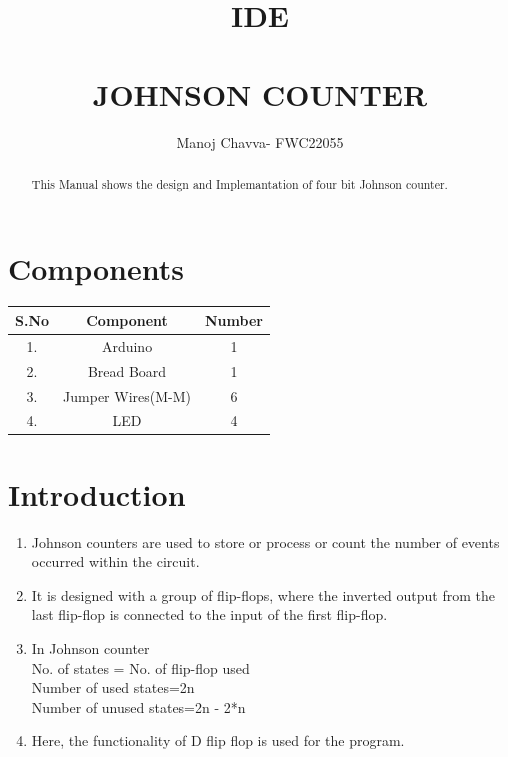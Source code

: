 \documentclass[journal,12pt,twocolumn]{IEEEtran}
\title{IDE  \\ \textbf{\\JOHNSON COUNTER}}
\author{Manoj Chavva- FWC22055}
\begin{document}
\maketitle

\tableofcontents
\vspace{0.5cm}
\begin{abstract}
  This Manual shows the design and Implemantation of four bit Johnson counter.
\end{abstract}   


 
     \section{Components}  
       

\begin{tabular}{|c|c|c|}
    \hline 
      \textbf{S.No} & \textbf{Component} & \textbf{Number}\\
      \hline
	1. & Arduino & 1 \\
	2. & Bread Board & 1 \\
	3. & Jumper Wires(M-M) & 6 \\
	4. & LED & 4 \\
	
      \hline
      
   \end{tabular}
   

     \vspace{0.35cm}




\section{Introduction}
\begin{enumerate}
  \item Johnson counters are used to store or process or count the number of events occurred within the circuit.
  \item It is designed with a group of flip-flops, where the inverted output from the last flip-flop is connected to the input of the first flip-flop.
  \item In Johnson counter
  \\No. of states = No. of flip-flop used  
\\Number of used states=2n  
\\Number of unused states=2n - 2*n  
\item Here, the functionality of D flip flop is used for the program. 
\end{enumerate}
\end{document}
